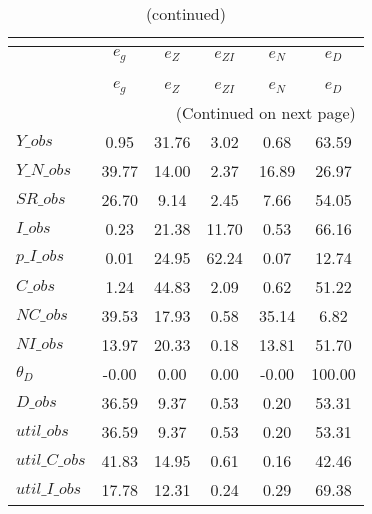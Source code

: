  
\begin{center}
\begin{longtable}{lccccc} 
\caption{VARIANCE DECOMPOSITION (in percent)}\\
 \label{Table:th_var_decomp_uncond}\\
\toprule 
$              $	 & 	 $       {e_g}$	 & 	 $       {e_Z}$	 & 	 $    {e_{ZI}}$	 & 	 $       {e_N}$	 & 	 $       {e_D}$\\
\midrule \endfirsthead 
\caption{(continued)}\\
 \toprule \\ 
$              $	 & 	 $       {e_g}$	 & 	 $       {e_Z}$	 & 	 $    {e_{ZI}}$	 & 	 $       {e_N}$	 & 	 $       {e_D}$\\
\midrule \endhead 
\midrule \multicolumn{6}{r}{(Continued on next page)} \\ \bottomrule \endfoot 
\bottomrule \endlastfoot 
$Y\_obs        $	 & 	        0.95	 & 	       31.76	 & 	        3.02	 & 	        0.68	 & 	       63.59 \\ 
$Y\_N\_obs     $	 & 	       39.77	 & 	       14.00	 & 	        2.37	 & 	       16.89	 & 	       26.97 \\ 
$SR\_obs       $	 & 	       26.70	 & 	        9.14	 & 	        2.45	 & 	        7.66	 & 	       54.05 \\ 
$I\_obs        $	 & 	        0.23	 & 	       21.38	 & 	       11.70	 & 	        0.53	 & 	       66.16 \\ 
$p\_I\_obs     $	 & 	        0.01	 & 	       24.95	 & 	       62.24	 & 	        0.07	 & 	       12.74 \\ 
$C\_obs        $	 & 	        1.24	 & 	       44.83	 & 	        2.09	 & 	        0.62	 & 	       51.22 \\ 
$NC\_obs       $	 & 	       39.53	 & 	       17.93	 & 	        0.58	 & 	       35.14	 & 	        6.82 \\ 
$NI\_obs       $	 & 	       13.97	 & 	       20.33	 & 	        0.18	 & 	       13.81	 & 	       51.70 \\ 
${\theta_D}    $	 & 	       -0.00	 & 	        0.00	 & 	        0.00	 & 	       -0.00	 & 	      100.00 \\ 
$D\_obs        $	 & 	       36.59	 & 	        9.37	 & 	        0.53	 & 	        0.20	 & 	       53.31 \\ 
$util\_obs     $	 & 	       36.59	 & 	        9.37	 & 	        0.53	 & 	        0.20	 & 	       53.31 \\ 
$util\_C\_obs  $	 & 	       41.83	 & 	       14.95	 & 	        0.61	 & 	        0.16	 & 	       42.46 \\ 
$util\_I\_obs  $	 & 	       17.78	 & 	       12.31	 & 	        0.24	 & 	        0.29	 & 	       69.38 \\ 
\end{longtable}
 \end{center}
